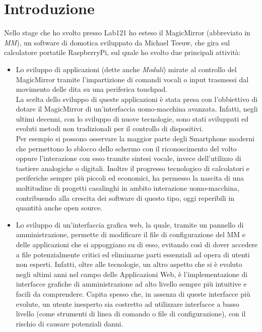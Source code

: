 \chapter*{Introduzione}

Nello stage che ho svolto presso Lab121 ho esteso il \cite{MagicMirror}MagicMirror (abbreviato in \emph{MM}), un software di domotica sviluppato da Michael Teeuw,
che gira sul calcolatore portatile RaspberryPi\cite{Raspberry}, sul quale ho svolto due principali attivit\`a:\\
\begin{itemize}
\item Lo sviluppo di applicazioni (dette anche \emph{Moduli}) mirate al controllo del
MagicMirror tramite l'impartizione di comandi vocali o input trasmessi dal movimento delle dita su
una periferica touchpad.\\
La scelta dello sviluppo di queste applicazioni \`e stata presa con l'obbiettivo di dotare il
MagicMirror di un'interfaccia uomo-macchina avanzata. Infatti, negli ultimi decenni, con lo sviluppo
di nuove tecnologie, sono stati sviluppati ed evoluti metodi non tradizionali per il controllo di dispositivi.\\
Per esempio si possono osservare la maggior parte degli Smartphone moderni che permettono lo sblocco dello schermo con
il riconoscimento del volto oppure l'interazione con esso tramite sintesi vocale,
invece dell'utilizzo di tastiere analogiche o digitali.
Inoltre il progresso tecnologico di calcolatori e periferiche sempre pi\`u piccoli ed economici, ha permesso
la nascita di una moltitudine di progetti casalinghi in ambito interazione uomo-macchina, contribuendo
alla crescita dei software di questo tipo, oggi reperibili in quantit\`a anche open source.\\[1\baselineskip]
\item Lo sviluppo di un'interfaccia grafica web, la quale, tramite un pannello di amministrazione,
 permette di modificare il file di configurazione del MM e delle applicazioni che si appoggiano su di esso,
evitando cos\`i di dover accedere
a file potenzialmente critici ed eliminarne parti essenziali ad opera di utenti non esperti.
Infatti, oltre alle tecnologie, un altro aspetto che si \`e evoluto negli ultimi anni
nel campo delle Applicazioni Web, \`e l'implementazione di interfacce grafiche di amministrazione
ad alto livello sempre pi\`u intuitive e facili da comprendere.
Capita spesso che, in assenza di queste interfacce pi\`u evolute, un utente inesperto sia
costretto ad utilizzare interfacce a basso livello (come strumenti di linea di comando o file
di configurazione), con il rischio di causare potenziali danni.\\[2\baselineskip]
\end{itemize}

